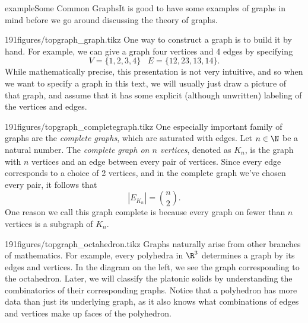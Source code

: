 \begin{framedpage}{example}{Some Common Graphs}{It is good to have some examples of graphs in mind before we go around discussing the theory of graphs.}

\begin{smallexamplefigureenv}[Graph:]{191figures/topgraph_graph.tikz}
One way to construct a graph is to build it by hand. 
For example, we can give a graph four vertices and 4 edges by specifying
  \[V=\{1,2,3,4\}\;\;\; E=\{12,23,13,14\}.\]
 While mathematically precise, this presentation is not very intuitive, and so when we want to specify a graph in this text, we will usually just draw a picture of that graph, and assume that it has some explicit (although unwritten) labeling of the vertices and edges.
\end{smallexamplefigureenv}


\begin{smallexamplefigureenv}{191figures/topgraph_completegraph.tikz}
  One especially important family of graphs are the \emph{complete graphs}, which are saturated with edges.
\noindent Let $n\in \N$ be a natural number. The \emph{complete graph on $n$ vertices},  denoted as $K_n$, is the graph with $n$ vertices and an edge between every pair of vertices. 
Since every edge corresponds to a choice of 2 vertices, and in the complete graph we've chosen every pair, it follows that 
\[|E_{K_n}|={n\choose 2}.\]
One reason we call this graph complete is because every graph on fewer than $n$ vertices is a subgraph of $K_n$. 
\end{smallexamplefigureenv}


\begin{smallexamplefigureenv}[Octahedron:]{191figures/topgraph_octahedron.tikz}
Graphs naturally arise from other branches of mathematics. 
For example, every polyhedra in $\R^3$ determines a graph by its edges and vertices. In the diagram on the left, we see the graph corresponding to the octahedron.
Later, we will classify the platonic solids by understanding the combinatorics of their corresponding graphs. 
Notice that a polyhedron has more data than just its underlying graph, as it also knows what combinations of edges and vertices make up faces of the polyhedron. 
\end{smallexamplefigureenv}
\end{framedpage}